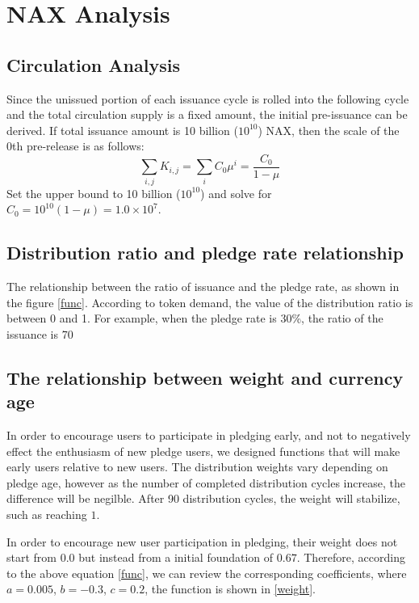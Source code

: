 \section{NAX Analysis}
\subsection{Circulation Analysis}
Since the unissued portion of each issuance cycle is rolled into the following cycle and the total circulation supply is a fixed amount, the initial pre-issuance can be derived. If total issuance amount is  10 billion (\(10^{10}\)) NAX, then the scale of the 0th pre-release is as follows:
\begin{equation}
  \sum_{i,j} K_{i,j} = \sum_i C_0 \mu^i = \frac{C_0}{1-\mu}
\end{equation}
  Set the upper bound to 10 billion (\(10^{10}\)) and solve for \(C_0 = 10^{10}(1-\mu) = 1.0\times10^7\).

\subsection{Distribution ratio and pledge rate relationship}
The relationship between the ratio of issuance and the pledge rate, as shown in the figure \ref{func}. According to token demand, the value of the distribution ratio is between 0 and 1. For example, when the pledge rate is 30\%, the ratio of the issuance is 70%

\subsection{The relationship between weight and currency age}
In order to encourage users to participate in pledging early, and not to negatively effect the enthusiasm of new pledge users, we designed functions that will make early users relative to new users. The distribution weights vary depending on pledge age, however as the number of completed distribution cycles increase, the difference will be negilble. After 90 distribution cycles, the weight will stabilize, such as reaching $1$. 

In order to encourage new user participation in pledging, their weight does not start from 0.0 but instead from a initial foundation of $0.67$. Therefore, according to the above equation \ref{func}, we can review the corresponding coefficients, where \(a=0.005\), \(b=-0.3\), \(c=0.2\), the function is shown in \ref{weight}. 

